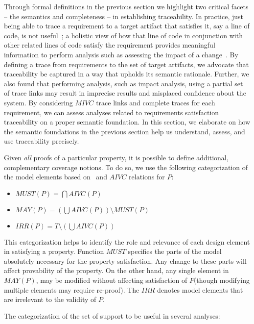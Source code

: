 
Through formal definitions in the previous section we highlight two critical facets -- the semantics and completeness -- in establishing traceability. 
In practice, just being able to trace a requirement to a target artifact that satisfies it, say a line of code, is not useful~\cite{guo2015trace}; a holistic view of how that line of code in conjunction with other related lines of code satisfy 
the requirement provides meaningful information to perform analysis such as assessing the impact of a change~\cite{hull2010requirements}. 
By defining a trace from requirements to the set of target artifacts, we advocate that traceability be captured in a way that upholds its semantic rationale. Further, we also found that performing analysis, such as impact analysis, using a partial set of trace links may result in imprecise results and misplaced confidence about the system. 
By considering $MIVC$ trace links and complete traces for each requirement, 
we can assess analyses related to requirements satisfaction traceability on a proper semantic foundation. In this section, we elaborate on how the semantic foundations in the previous section help us understand, assess, and use traceability precisely.

Given {\em all} proofs of a particular property, it is possible to define additional, complementary coverage notions.  
To do so, we use the following categorization of the model elements based on \mivc ~and 
$AIVC$ relations for $P$:

\begin{itemize}
\item $MUST (P) = \bigcap AIVC(P)$
\item $MAY(P) = (\bigcup AIVC (P)) \setminus MUST (P)$
\item $IRR(P) = T \setminus (\bigcup AIVC (P))$
\end{itemize}

\noindent This categorization helps to identify the role and relevance of each design element in satisfying a property. Function $MUST$ specifies the parts of the model absolutely necessary for the property satisfaction.  Any change to these parts will affect provability of the property. On the other hand, any single element in $MAY (P)$, may be modified without affecting satisfaction of $P$(though modifying multiple elements may require re-proof). The $IRR$ denotes model elements that are irrelevant to the validity of $P$.

The categorization of the set of support to be useful in several analyses:

